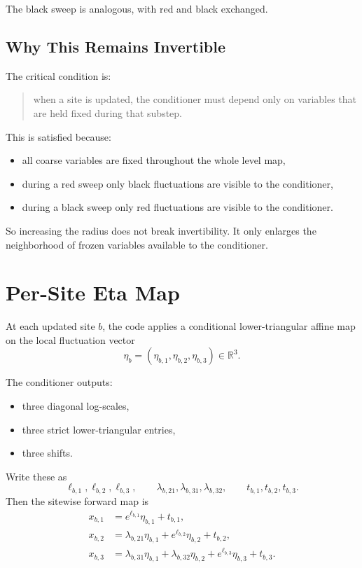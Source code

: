 \documentclass[11pt]{article}
\begin{document}
The black sweep is analogous, with red and black exchanged.

\subsection{Why This Remains Invertible}

The critical condition is:
\begin{quote}
when a site is updated, the conditioner must depend only on variables that are
held fixed during that substep.
\end{quote}

This is satisfied because:
\begin{itemize}
\item all coarse variables are fixed throughout the whole level map,
\item during a red sweep only black fluctuations are visible to the
conditioner,
\item during a black sweep only red fluctuations are visible to the
conditioner.
\end{itemize}

So increasing the radius does not break invertibility. It only enlarges the
neighborhood of frozen variables available to the conditioner.

\section{Per-Site Eta Map}

At each updated site $b$, the code applies a conditional lower-triangular
affine map on the local fluctuation vector
\[
\eta_b=(\eta_{b,1},\eta_{b,2},\eta_{b,3})\in\mathbb{R}^3.
\]

The conditioner outputs:
\begin{itemize}
\item three diagonal log-scales,
\item three strict lower-triangular entries,
\item three shifts.
\end{itemize}

Write these as
\[
\ell_{b,1},\ell_{b,2},\ell_{b,3},
\qquad
\lambda_{b,21},\lambda_{b,31},\lambda_{b,32},
\qquad
t_{b,1},t_{b,2},t_{b,3}.
\]
Then the sitewise forward map is
\begin{align}
x_{b,1} &= e^{\ell_{b,1}} \eta_{b,1} + t_{b,1}, \\
x_{b,2} &= \lambda_{b,21}\eta_{b,1} + e^{\ell_{b,2}}\eta_{b,2} + t_{b,2}, \\
x_{b,3} &= \lambda_{b,31}\eta_{b,1} + \lambda_{b,32}\eta_{b,2}
         + e^{\ell_{b,3}}\eta_{b,3} + t_{b,3}.
\end{align}
\end{document}
